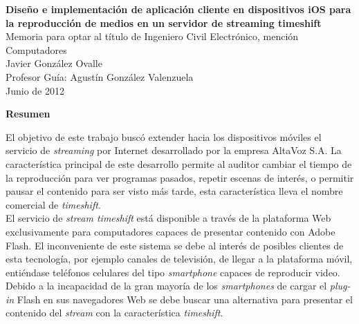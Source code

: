 \newpage
\thispagestyle{empty}
\begin{center}
 \Large \textbf{Diseño e implementación de aplicación cliente en dispositivos iOS para la reproducción de medios en un servidor de streaming timeshift}\\

\normalsize Memoria para optar al título de Ingeniero Civil Electrónico, mención Computadores \\
\normalsize Javier González Ovalle \\
\normalsize Profesor Guía: Agustín González Valenzuela \\
\normalsize Junio de 2012

\Large \textbf{Resumen}

\end{center}
\normalsize


El objetivo de este trabajo buscó extender hacia los dispositivos móviles el servicio de \textit{streaming} por Internet desarrollado por la empresa AltaVoz S.A. La característica principal de este desarrollo permite al auditor cambiar el tiempo de la reproducción para ver programas pasados, repetir escenas de interés, o permitir pausar el contenido para ser visto más tarde, esta característica lleva el nombre comercial de \textit{timeshift}.\\


El servicio de \textit{stream timeshift} está disponible a través de la plataforma Web exclusivamente para computadores capaces de presentar contenido con Adobe Flash. El inconveniente de este sistema se debe al interés de posibles clientes de esta tecnología, por ejemplo canales de televisión, de llegar a la plataforma móvil, entiéndase teléfonos celulares del tipo \textit{smartphone} capaces de reproducir video. Debido a la incapacidad de la gran mayoría de los \textit{smartphones} de cargar el \textit{plug-in} Flash en sus navegadores Web se debe buscar una alternativa para presentar el contenido del \textit{stream} con la característica \textit{timeshift}.
\\

